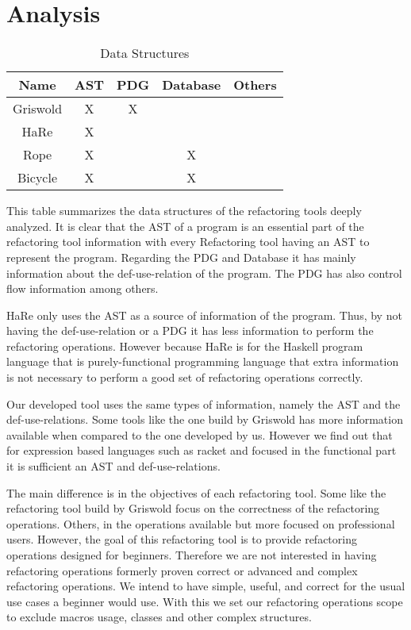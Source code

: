 \section{Analysis}
\begin{table}[]
\centering
\caption{Data Structures}
\label{my-label}
\begin{tabular}{c|c|c|c|c}
Name     & AST & PDG & Database & Others \\ \hline
Griswold & X   & X   &          &        \\ \hline
HaRe     & X   &     &          &        \\ \hline
Rope     & X   &     & X        &        \\ \hline
Bicycle  & X   &     & X        &
\end{tabular}
\end{table}

This table summarizes the data structures of the refactoring tools deeply analyzed.
It is clear that the AST of a program is an essential part of the refactoring
tool information with every Refactoring tool having an AST to represent the program.
Regarding the PDG and Database it has mainly information about the def-use-relation
of the program. The PDG has also control flow information among others.

HaRe only uses the AST as a source of information of the program. Thus, by not having
the def-use-relation or a PDG it has less information to perform the refactoring operations.
However because HaRe is for the Haskell program language that is purely-functional
programming language that extra information is not necessary to perform a good set of
refactoring operations correctly.



Our developed tool uses the same types of information, namely the AST and the def-use-relations.
Some tools like the one build by Griswold has more information available when compared
to the one developed by us.
However we find out that for expression based languages such as racket and focused
in the functional part it is sufficient an AST and def-use-relations.%

The main difference is in the objectives of each refactoring tool.
Some like the refactoring tool build by Griswold focus on the correctness of the refactoring
operations.
Others, in the operations available but more focused on professional users.
However, the goal of this refactoring tool is to provide refactoring operations
designed for beginners. %
Therefore we are not interested in having refactoring operations formerly proven %
correct or advanced and complex refactoring operations. %
We intend to have simple, useful, and correct for the usual use cases a beginner would use.
With this we set our refactoring operations scope to exclude macros usage, classes
and other complex structures.


